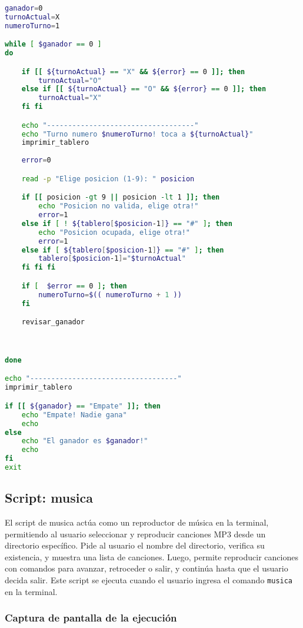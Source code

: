 \documentclass{article}
\begin{document}
\begin{lstlisting}[language=bash]
ganador=0
turnoActual=X
numeroTurno=1

while [ $ganador == 0 ] 
do

    if [[ ${turnoActual} == "X" && ${error} == 0 ]]; then
        turnoActual="O"
    else if [[ ${turnoActual} == "O" && ${error} == 0 ]]; then
        turnoActual="X"
    fi fi

    echo "-----------------------------------"
    echo "Turno numero $numeroTurno! toca a ${turnoActual}"
    imprimir_tablero
    
    error=0

    read -p "Elige posicion (1-9): " posicion

    if [[ posicion -gt 9 || posicion -lt 1 ]]; then
        echo "Posicion no valida, elige otra!"
        error=1
    else if [ ! ${tablero[$posicion-1]} == "#" ]; then
        echo "Posicion ocupada, elige otra!"
        error=1
    else if [ ${tablero[$posicion-1]} == "#" ]; then
        tablero[$posicion-1]="$turnoActual"
    fi fi fi

    if [  $error == 0 ]; then
        numeroTurno=$(( numeroTurno + 1 ))
    fi

    revisar_ganador



done

echo "-----------------------------------"
imprimir_tablero

if [[ ${ganador} == "Empate" ]]; then
    echo "Empate! Nadie gana"
    echo
else
    echo "El ganador es $ganador!"
    echo
fi
exit

\end{lstlisting}
\pagebreak
\subsection{Script: musica}

El script de musica actúa como un reproductor de música en la terminal, permitiendo al usuario seleccionar y reproducir canciones MP3 desde un directorio específico. Pide al usuario el nombre del directorio, verifica su existencia, y muestra una lista de canciones. Luego, permite reproducir canciones con comandos para avanzar, retroceder o salir, y continúa hasta que el usuario decida salir. 
Este script se ejecuta cuando el usuario ingresa el comando \texttt{musica} en la terminal.

\subsubsection{Captura de pantalla de la ejecución}
\end{document}
